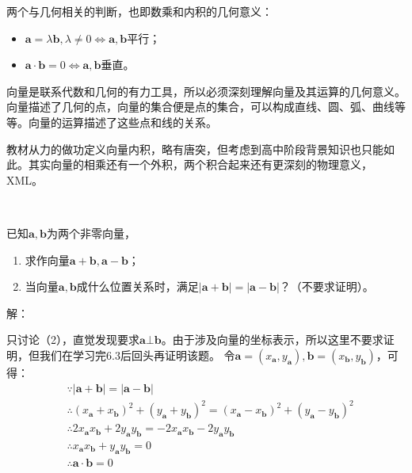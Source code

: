 两个与几何相关的判断，也即数乘和内积的几何意义：
\begin{itemize}
    \item $\boldsymbol{a}=\lambda \boldsymbol{b},\lambda \ne 0\Leftrightarrow \boldsymbol{a},\boldsymbol{b}\text{平行}$；
    \item $\boldsymbol{a}\cdot \boldsymbol{b}=0\Leftrightarrow \boldsymbol{a},\boldsymbol{b}\text{垂直}$。
\end{itemize}

\begin{tcolorbox}
向量是联系代数和几何的有力工具，所以必须深刻理解向量及其运算的几何意义。向量描述了几何的点，向量的集合便是点的集合，可以构成直线、圆、弧、曲线等等。向量的运算描述了这些点和线的关系。
\end{tcolorbox}

\begin{tcolorbox}
教材从力的做功定义向量内积，略有唐突，但考虑到高中阶段背景知识也只能如此。其实向量的相乘还有一个外积，两个积合起来还有更深刻的物理意义，XML。
\end{tcolorbox}

~

\begin{example}[复习巩固7]
已知$\boldsymbol{a},\boldsymbol{b}$为两个非零向量，
\begin{enumerate}
    \item 求作向量$\boldsymbol{a}+\boldsymbol{b},\boldsymbol{a}-\boldsymbol{b}$；
    \item 当向量$\boldsymbol{a},\boldsymbol{b}$成什么位置关系时，满足$\left| \boldsymbol{a}+\boldsymbol{b} \right|=\left| \boldsymbol{a}-\boldsymbol{b} \right|$？（不要求证明）。
\end{enumerate}
\end{example}

解：

只讨论（2），直觉发现要求$\boldsymbol{a}\bot \boldsymbol{b}$。由于涉及向量的坐标表示，所以这里不要求证明，但我们在学习完6.3后回头再证明该题。
令$\boldsymbol{a}=\left( x_{\boldsymbol{a}},y_{\boldsymbol{a}} \right) ,\boldsymbol{b}=\left( x_{\boldsymbol{b}},y_{\boldsymbol{b}} \right) $，可得：
\begin{align*}
&\because \left| \boldsymbol{a}+\boldsymbol{b} \right|=\left| \boldsymbol{a}-\boldsymbol{b} \right| \\
&\therefore \left( x_{\boldsymbol{a}}+x_{\boldsymbol{b}} \right) ^2+\left( y_{\boldsymbol{a}}+y_{\boldsymbol{b}} \right) ^2=\left( x_{\boldsymbol{a}}-x_{\boldsymbol{b}} \right) ^2+\left( y_{\boldsymbol{a}}-y_{\boldsymbol{b}} \right) ^2 \\
&\therefore 2x_{\boldsymbol{a}}x_{\boldsymbol{b}}+2y_{\boldsymbol{a}}y_{\boldsymbol{b}}=-2x_{\boldsymbol{a}}x_{\boldsymbol{b}}-2y_{\boldsymbol{a}}y_{\boldsymbol{b}} \\
&\therefore x_{\boldsymbol{a}}x_{\boldsymbol{b}}+y_{\boldsymbol{a}}y_{\boldsymbol{b}}=0 \\
&\therefore \boldsymbol{a}\cdot \boldsymbol{b}=0
\end{align*}

